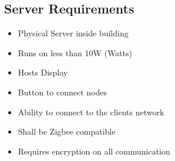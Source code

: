 \subsection{Server Requirements}
\begin{itemize}
 \item Physical Server inside building
 \item Runs on less than 10W (Watts)
 \item Hosts Display
 \item Button to connect nodes
 \item Ability to connect to the clients network
 \item Shall be Zigbee compatible
 \item Requires encryption on all communication
\end{itemize}

